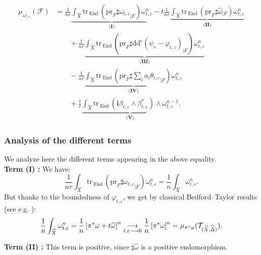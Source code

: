 \documentclass[12pt,a4paper]{amsart}
\newcommand{\End}{\mathrm{End}\,}
\newcommand{\ddc}{\mathrm{dd^c}}
\newcommand{\tr}{\mathrm{tr}\,}
\theoremstyle{plain}
\theoremstyle{definition}
\begin{document}
\begin{align*}\label{Slope of the subsheaf}
    \tag*{$(\ast)$} \mu_{\omega_{t, \varepsilon}}(\mathcal{F}) & = \frac{1}{ nr} \underbrace{\int_{\widehat{X}} \tr_\End (\mathrm{pr}_F \sharp {\omega_{t, \varepsilon}}_{|F}) \omega_{t, \varepsilon}^n}_{\textbf{(I)}} -t \frac{1}{ nr} \underbrace{\int_{\widehat{X}} \tr_\End (\mathrm{pr}_F \sharp \widehat{\omega}_{|F}) \omega_{t, \varepsilon}^n}_{\textbf{(II)}} \\
    & \qquad + \frac{1}{ nr} \underbrace{\int_{\widehat{X}} \tr_\End (\mathrm{pr}_F \sharp \ddc (\psi_\varepsilon - \varphi_{t,\varepsilon})_{|F}) \omega_{t, \varepsilon}^n}_{\textbf{(III)}} \\
    & \qquad - \frac{1}{ nr} \underbrace{\int_{\widehat{X}} \tr_\End \left( \mathrm{pr}_F \sharp \sum_i a_i {\theta_{i,\varepsilon}}_{|F} \right) \omega_{t, \varepsilon}^n}_{\textbf{(IV)}} \\
    & \qquad + \frac{1}{ r} \underbrace{\int_{\widehat{X}} \tr_\End \left(\textbf{i}\beta_{t, \varepsilon} \wedge \beta_{t, \varepsilon}^* \right) \wedge \omega_{t, \varepsilon}^{n-1}}_{\textbf{(V)}}.
\end{align*}

\subsubsection{Analysis of the different terms}\label{Analysis of different terms}

We analyze here the different terms appearing in the above equality.\\

\textbf{Term (I) :} We have:
$$
\frac{1}{ nr} \int_{\widehat{X}} \tr_\End (\mathrm{pr}_F \sharp {\omega_{t, \varepsilon}}_{|F}) \omega_{t, \varepsilon}^n = \frac{1}{n} \int_{\widehat{X}} \omega_{t, \varepsilon}^n.
$$
But thanks to the boundedness of $\varphi_{t, \varepsilon}$, we get by classical Bedford--Taylor results (see e.g. \cite[Thm.~2.1]{Dar19}):
$$
\frac{1}{n} \int_{\widehat{X}} \omega_{t, \varepsilon}^n = \frac{1}{n} \left[\pi^* \omega + t\widehat{\omega} \right]^n \underset{t, \varepsilon \longrightarrow 0}{\longrightarrow} \frac{1}{n} \left[\pi^* \omega\right]^n = \mu_{\pi^*\omega} (\mathcal{T}_{(\widehat{X}, \widehat{\Delta})}).\\
$$

\textbf{Term (II) :} This term is positive, since $\sharp \widehat{\omega}$ is a positive endomorphism.\\
\end{document}
